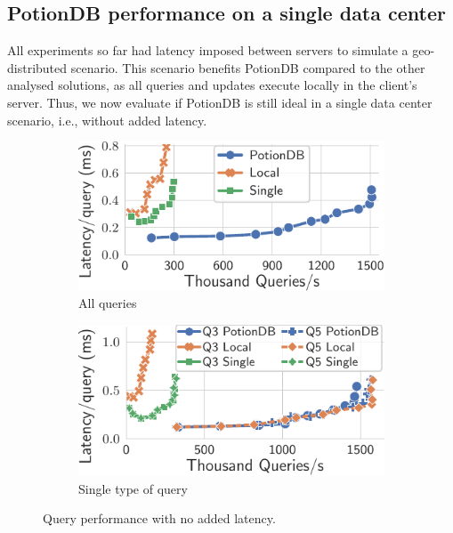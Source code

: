 \documentclass[sigconf, nonacm]{acmart}
\begin{document}
\subsection{PotionDB performance on a single data center}

All experiments so far had latency imposed between servers to simulate a geo-distributed scenario.
This scenario benefits PotionDB compared to the other analysed solutions, as all queries and updates execute locally in the client's server.
Thus, we now evaluate if PotionDB is still ideal in a single data center scenario, i.e., without added latency. %

\begin{figure}
	\centering
	\begin{subfigure}{.49\linewidth}
		\includegraphics[width=1\linewidth]{singleQuery/all_queries_noTC}
		\caption{All queries}
		\label{fig:all_queries_noTC}
	\end{subfigure}%
	\hspace*{0.2em}
	\begin{subfigure}{.49\linewidth}
		\includegraphics[width=1\linewidth]{singleQuery/q3_q5_noLatency}
		\caption{Single type of query}
		\label{fig:q3_q5_noTC}
	\end{subfigure}%
	\vspace*{-0.65em}
	\caption{Query performance with no added latency.}
	\label{fig:global_local_single_noTC}
	\vspace*{-1.2em}
\end{figure}
\end{document}
